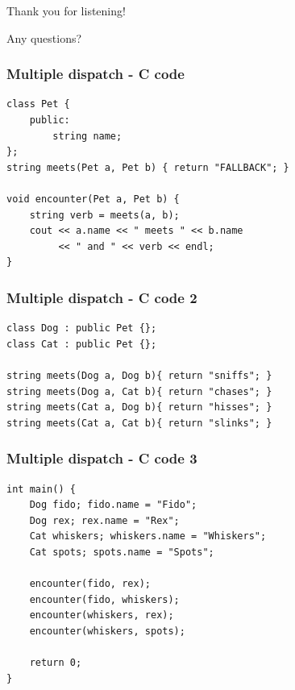 \documentclass{beamer}
\begin{document}
\begin{frame}
	\nocite{*}
	\printbibliography
\end{frame}


\begin{frame}
	\begin{center}
		\huge{Thank you for listening!}

		\small{Any questions?}
	\end{center}
\end{frame}


\appendix

\begin{frame}[fragile]
    \frametitle{Multiple dispatch - C code}

\begin{verbatim}
class Pet {
    public:
        string name;
};
string meets(Pet a, Pet b) { return "FALLBACK"; }

void encounter(Pet a, Pet b) {
    string verb = meets(a, b);
    cout << a.name << " meets " << b.name
         << " and " << verb << endl;
}
\end{verbatim}

\end{frame}


\begin{frame}[fragile]
    \frametitle{Multiple dispatch - C code 2}

\begin{verbatim}
class Dog : public Pet {};
class Cat : public Pet {};

string meets(Dog a, Dog b){ return "sniffs"; }
string meets(Dog a, Cat b){ return "chases"; }
string meets(Cat a, Dog b){ return "hisses"; }
string meets(Cat a, Cat b){ return "slinks"; }
\end{verbatim}

\end{frame}

\begin{frame}[fragile]
    \frametitle{Multiple dispatch - C code 3}

\begin{verbatim}
int main() {
    Dog fido; fido.name = "Fido";
    Dog rex; rex.name = "Rex";
    Cat whiskers; whiskers.name = "Whiskers";
    Cat spots; spots.name = "Spots";

    encounter(fido, rex);
    encounter(fido, whiskers);
    encounter(whiskers, rex);
    encounter(whiskers, spots);

    return 0;
}
\end{verbatim}

\end{frame}
\end{document}
